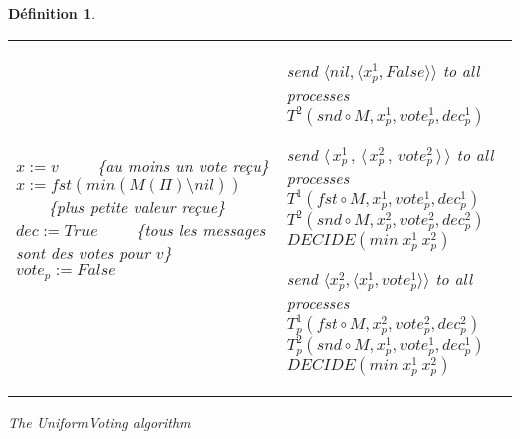 \documentclass{article}
\newtheorem{definition}{Définition}
\begin{document}
\begin{definition}
\begin{algorithm}[htb]
{\begin{distribalgo}[1]
\begin{tabular}{ll}
\begin{minipage}{41em}
	\INDENT{$T^2_p(M, ref ~ x, ref ~ vote, ref ~ dec):$}

		\IF{$\exists v \in V, q \in \Pi, M(q) = \langle v, True \rangle$}
			\STATE $x := v$ ~~~~\{au moins un vote reçu\}
		\ELSE
			\STATE $x := fst (min (M(\Pi) \setminus {nil}))$ ~~~~\{plus petite valeur reçue\}
		\ENDIF
		\IF{$M(\Pi) = \{\langle v, True \rangle\}$}
			\STATE $dec := True$ ~~~~\{tous les messages sont des votes pour $v$\}
		\ENDIF
		\STATE $vote_p := False$
	\ENDINDENT
\ENDINDENT

\end{minipage}
&
\begin{minipage}{31em}

\INDENT{\textbf{Round $r=0\,$:}}
	\INDENT{$S_p:$}
		\STATE send $\langle nil, \langle  x^1_p , False \rangle \rangle$ to all processes
	\ENDINDENT
	\INDENT{$T_p(M):$}
		\STATE $T^2(snd \circ M, x^1_p, vote^1_p, dec^1_p)$
	\ENDINDENT
\ENDINDENT

\INDENT{\textbf{Round $r=2\phi+1\,$:}}
	\INDENT{$S_p:$}
		\STATE send $\langle\, x^1_p\, ,\, \langle \, x^2_p \, ,\, vote^2_p \, \rangle \, \rangle$ to all processes
	\ENDINDENT
	\BLANK
	\INDENT{$T_p(M):$}
		\STATE $T^1(fst \circ M, x^1_p, vote^1_p, dec^1_p)$
		\STATE $T^2(snd \circ M, x^2_p, vote^2_p, dec^2_p)$
		\IF{$dec^1_p \wedge dec^2_p $}
			\STATE $DECIDE(min ~ x^1_p ~ x^2_p)$
		\ENDIF
	\ENDINDENT
\ENDINDENT

\INDENT{\textbf{Round $r=2\phi+2\,$:}}
	\INDENT{$S_p:$}
		\STATE send $\langle x^2_p , \langle x^1_p, vote^1_p \rangle \rangle$ to all processes
	\ENDINDENT
	\BLANK
	\INDENT{$T_p(M)$}
		\STATE $T^1_p(fst \circ M, x_p^2, vote^2_p, dec^2_p)$
		\STATE $T^2_p(snd \circ M, x_p^1, vote^1_p, dec^1_p)$
		\IF{$dec^1_p \wedge dec^2_p $}
			\STATE $DECIDE(min ~ x^1_p ~ x^2_p)$
		\ENDIF
	\ENDINDENT
\ENDINDENT

\end{minipage}
\end{tabular}

\caption{The {\em UniformVoting} algorithm}
\label{unifvotfig}
\end{distribalgo}
}
\end{algorithm}


\end{definition}
\end{document}
